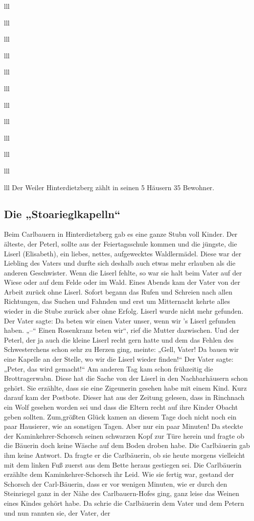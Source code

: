 \documentclass[12pt,a4pager]{book}
\begin{document}
\begin{tabuluar}{lll}
\begin{tabuluar}{lll}
\begin{tabuluar}{lll}
\begin{tabuluar}{lll}
\begin{tabuluar}{lll}
\begin{tabuluar}{lll}
\begin{tabuluar}{lll}
\begin{tabuluar}{lll}
\begin{tabuluar}{lll}
\begin{tabuluar}{lll}
\begin{tabuluar}{lll}
\begin{tabuluar}{lll}
Der Weiler Hinterdietzberg zählt in seinen 5 Häusern 35 Bewohner.

\subsection{Die „Stoarieglkapelln“}

Beim Carlbauern in Hinterdietzberg gab es eine ganze Stubn voll Kinder. Der
älteste, der Peterl, sollte aus der Feiertagsschule kommen und die jüngste, die
Liserl (Elisabeth), ein liebes, nettes, aufgewecktes Waldlermädel. Diese war der
Liebling des Vaters und durfte sich deshalb auch etwas mehr erlauben als die
anderen Geschwister. Wenn die Liserl fehlte, so war sie halt beim Vater auf der
Wiese oder auf dem Felde oder im Wald. Eines Abends kam der Vater von der Arbeit
zurück ohne Liserl. Sofort begann das Rufen und Schreien nach allen Richtungen,
das Suchen und Fahnden und erst um Mitternacht kehrte alles wieder in die Stube
zurück aber ohne Erfolg. Liserl wurde nicht mehr gefunden. Der Vater sagte: Da
beten wir einen Vater unser, wenn wir 's Liserl gefunden haben. „--“ Einen
Rosenkranz beten wir“, rief die Mutter dazwischen. Und der Peterl, der ja auch
die kleine Liserl recht gern hatte und dem das Fehlen des Schwesterchens schon
sehr zu Herzen ging, meinte: „Gell, Vater! Da bauen wir eine Kapelle an der
Stelle, wo wir die Liserl wieder finden!“ Der Vater sagte: „Peter, das wird
gemacht!“ Am anderen Tag kam schon frühzeitig die Brottragerwabn. Diese hat die
Sache von der Liserl in den Nachbarhäusern schon gehört. Sie erzählte, dass sie
eine Zigeunerin gesehen habe mit einem Kind. Kurz darauf kam der Postbote.
Dieser hat aus der Zeitung gelesen, dass in Rinchnach ein Wolf gesehen worden
sei und dass die Eltern recht auf ihre Kinder Obacht geben sollten. Zum,größten
Glück kamen an diesem Tage doch nicht noch ein paar Hausierer, wie an sonstigen
Tagen. Aber nur ein paar Minuten! Da steckte der Kaminkehrer-Schorsch seinen
schwarzen Kopf zur Türe herein und fragte ob die Bäuerin doch keine Wäsche auf
dem Boden droben habe. Die Carlbäuerin gab ihm keine Antwort. Da fragte er die
Carlbäuerin, ob sie heute morgens vielleicht mit dem linken Fuß zuerst aus dem
Bette heraus gestiegen sei. Die Carlbäuerin erzählte dem Kaminkehrer-Schorsch
ihr Leid. Wie sie fertig war, gestand der Schorsch der Carl-Bäuerin, dass er vor
wenigen Minuten, wie er durch den Steinriegel ganz in der Nähe des
Carlbauern-Hofes ging, ganz leise das Weinen eines Kindes gehört habe. Da schrie
die Carlbäuerin dem Vater und dem Petern und nun rannten sie, der Vater, der

\end{tabuluar}
\end{tabuluar}
\end{tabuluar}
\end{tabuluar}
\end{tabuluar}
\end{tabuluar}
\end{tabuluar}
\end{tabuluar}
\end{tabuluar}
\end{tabuluar}
\end{tabuluar}
\end{tabuluar}
\end{document}
